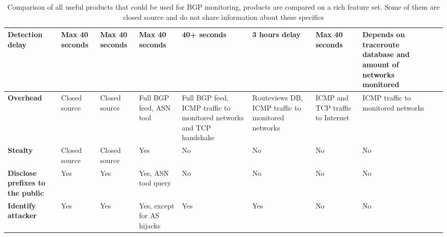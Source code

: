 \begin{landscape}
\begin{table}[h]
{\begin{tabular}{p{7.5cm}|p{1.5cm}|p{1.5cm}|p{4cm}|p{4.5cm}|p{3.5cm}|p{5cm}|p{3.5cm}|p{4cm}|}
                \textbf{Detection delay\cite{shi2012detecting}} & Max 40 seconds & Max 40 seconds & Max 40 seconds & 40+ seconds & 3 hours delay & Max 40 seconds & Depends on traceroute database and amount of networks monitored \\ \hline
                \textbf{Overhead\cite{shi2012detecting}} & Closed source & Closed source & Full BGP feed, ASN tool & Full BGP feed, ICMP traffic to monitored networks and TCP handshake & Routeviews DB, ICMP traffic to monitored networks & ICMP and TCP traffic to Internet & ICMP traffic to monitored networks \\ \hline
                \textbf{Stealty\cite{hu2007accurate}} & Closed source & Closed source & Yes & No & No & No & No \\ \hline
                \textbf{Disclose prefixes to the public} & Yes & Yes & Yes, ASN tool query & No & No & No & No \\ \hline
                \textbf{Identify attacker\cite{shi2012detecting, zhang2008ispy}} & Yes & Yes & Yes, except for AS hijacks & Yes & Yes & No & No \\ \hline
        \end{tabular}}
        \caption{Comparison of all useful products that could be used for BGP monitoring, products are compared on a rich feature set. Some of them are closed source and do not share information about these specifics}
\end{table}
\vspace*{\fill}
\end{landscape}
\restoregeometry
